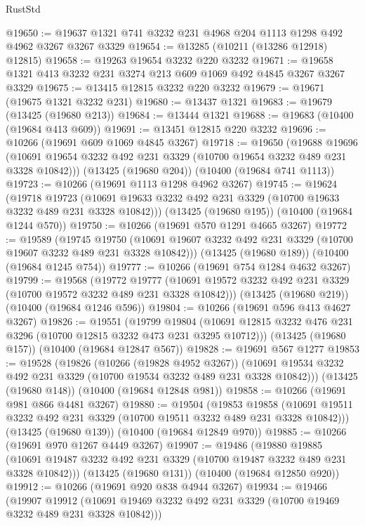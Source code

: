 \begin{lexlean}{RustStd}
\begin{coremodule}
{\begin{coremodule}
{{{{{{{{{{{{{{{{{{{{{{{{{@19650 := @19637 @1321 @741 @3232 @231 @4968 @204 @1113 @1298 @492 @4962 @3267 @3267 @3329
@19654 := @13285 (@10211 (@13286 @12918) @12815)
@19658 := @19263 @19654 @3232 @220 @3232
@19671 := @19658 @1321 @413 @3232 @231 @3274 @213 @609 @1069 @492 @4845 @3267 @3267 @3329
@19675 := @13415 @12815 @3232 @220 @3232
@19679 := @19671 (@19675 @1321 @3232 @231)
@19680 := @13437 @1321
@19683 := @19679 (@13425 (@19680 @213))
@19684 := @13444 @1321
@19688 := @19683 (@10400 (@19684 @413 @609))
@19691 := @13451 @12815 @220 @3232
@19696 := @10266 (@19691 @609 @1069 @4845 @3267)
@19718 := @19650
    (@19688
      @19696
      (@10691 @19654 @3232 @492 @231 @3329 (@10700 @19654 @3232 @489 @231 @3328 @10842)))
    (@13425 (@19680 @204))
    (@10400 (@19684 @741 @1113))
@19723 := @10266 (@19691 @1113 @1298 @4962 @3267)
@19745 := @19624
    (@19718
      @19723
      (@10691 @19633 @3232 @492 @231 @3329 (@10700 @19633 @3232 @489 @231 @3328 @10842)))
    (@13425 (@19680 @195))
    (@10400 (@19684 @1244 @570))
@19750 := @10266 (@19691 @570 @1291 @4665 @3267)
@19772 := @19589
    (@19745
      @19750
      (@10691 @19607 @3232 @492 @231 @3329 (@10700 @19607 @3232 @489 @231 @3328 @10842)))
    (@13425 (@19680 @189))
    (@10400 (@19684 @1245 @754))
@19777 := @10266 (@19691 @754 @1284 @4632 @3267)
@19799 := @19568
    (@19772
      @19777
      (@10691 @19572 @3232 @492 @231 @3329 (@10700 @19572 @3232 @489 @231 @3328 @10842)))
    (@13425 (@19680 @219))
    (@10400 (@19684 @1246 @596))
@19804 := @10266 (@19691 @596 @413 @4627 @3267)
@19826 := @19551
    (@19799
      @19804
      (@10691 @12815 @3232 @476 @231 @3296 (@10700 @12815 @3232 @473 @231 @3295 @10712)))
    (@13425 (@19680 @157))
    (@10400 (@19684 @12847 @567))
@19828 := @19691 @567 @1277
@19853 := @19528
    (@19826
      (@10266 (@19828 @4952 @3267))
      (@10691 @19534 @3232 @492 @231 @3329 (@10700 @19534 @3232 @489 @231 @3328 @10842)))
    (@13425 (@19680 @148))
    (@10400 (@19684 @12848 @981))
@19858 := @10266 (@19691 @981 @866 @4481 @3267)
@19880 := @19504
    (@19853
      @19858
      (@10691 @19511 @3232 @492 @231 @3329 (@10700 @19511 @3232 @489 @231 @3328 @10842)))
    (@13425 (@19680 @139))
    (@10400 (@19684 @12849 @970))
@19885 := @10266 (@19691 @970 @1267 @4449 @3267)
@19907 := @19486
    (@19880
      @19885
      (@10691 @19487 @3232 @492 @231 @3329 (@10700 @19487 @3232 @489 @231 @3328 @10842)))
    (@13425 (@19680 @131))
    (@10400 (@19684 @12850 @920))
@19912 := @10266 (@19691 @920 @838 @4944 @3267)
@19934 := @19466
    (@19907
      @19912
      (@10691 @19469 @3232 @492 @231 @3329 (@10700 @19469 @3232 @489 @231 @3328 @10842)))
}}}}}}}}}}}}}}}}}}}}}}}}}
\end{coremodule}}
\end{coremodule}
\end{lexlean}
